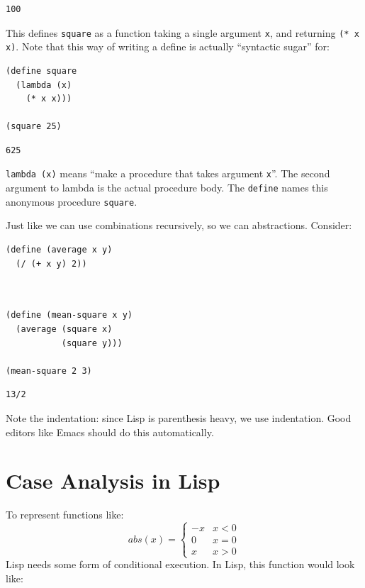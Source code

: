 \documentclass[9pt]{report}
\begin{document}
\begin{verbatim}
100
\end{verbatim}


This defines \texttt{square} as a function taking a single argument \texttt{x},
and returning \texttt{(* x x)}. Note that this way of writing a define is
actually ``syntactic sugar'' for:

\begin{verbatim}
(define square
  (lambda (x)
    (* x x)))

(square 25)
\end{verbatim}

\begin{verbatim}
625
\end{verbatim}


\texttt{lambda (x)} means ``make a procedure that takes argument \texttt{x}''. The
second argument to lambda is the actual procedure body. The
\texttt{define} names this anonymous procedure \texttt{square}.

Just like we can use combinations recursively, so we can
abstractions. Consider:

\begin{verbatim}
(define (average x y)
  (/ (+ x y) 2))
\end{verbatim}

\begin{verbatim}


(define (mean-square x y)
  (average (square x)
           (square y)))

(mean-square 2 3)
\end{verbatim}

\begin{verbatim}
13/2
\end{verbatim}


Note the indentation: since Lisp is parenthesis heavy, we use
indentation. Good editors like Emacs should do this automatically.

\section{Case Analysis in Lisp}
\label{sec:org39881ba}

To represent functions like:
$$abs(x) = \begin{cases}
   -x & x<0\\
   0 & x = 0\\
   x & x > 0
   \end{cases}$$
Lisp needs some form of conditional execution. In Lisp, this
function would look like:
\end{document}
